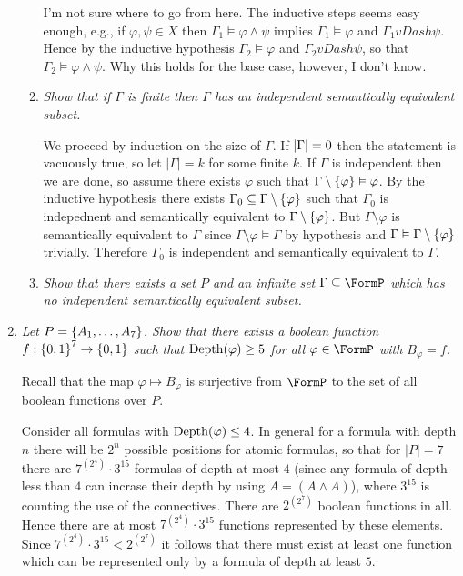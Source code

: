 \documentclass[10pt]{article}
\begin{document}
\begin{enumerate}
\begin{enumerate}
I'm not sure where to go from here.  The inductive steps seems easy enough, e.g., if $\varphi, \psi \in X$ then $\Gamma_1 \vDash \varphi \land \psi$ implies $\Gamma_1 \vDash \varphi$ and $\Gamma_1 vDash \psi$. Hence by the inductive hypothesis $\Gamma_2 \vDash \varphi$ and $\Gamma_2 vDash \psi$, so that $\Gamma_2 \vDash \varphi \land \psi$.  Why this holds for the base case, however, I don't know.

\item \emph{Show that if $\Gamma$ is finite then $\Gamma$ has an independent semantically equivalent subset.}

We proceed by induction on the size of $\Gamma$.  If $\left| \Gamma \right| = 0$ then the statement is vacuously true, so let $|\Gamma| = k$ for some finite $k$.  If $\Gamma$ is independent then we are done, so assume there exists $\varphi$ such that $\Gamma \setminus \left\{ \varphi \right\} \vDash \varphi$.  By the inductive hypothesis there exists $\Gamma_0 \subseteq \Gamma\setminus\left\{ \varphi \right\}$ such that $\Gamma_0$ is indepednent and semantically equivalent to $\Gamma \setminus \left\{ \varphi \right\}$.  But $\Gamma \setminus{\varphi}$ is semantically equivalent to $\Gamma$ since $\Gamma \setminus{\varphi} \vDash \Gamma$ by hypothesis and $\Gamma \vDash \Gamma \setminus \left\{ \varphi \right\}$ trivially.  Therefore $\Gamma_0$ is independent and semantically equivalent to $\Gamma$.

\item \emph{Show that there exists a set $P$ and an infinite set $\Gamma \subseteq \FormP$ which has no independent semantically equivalent subset.}
\end{enumerate}

\item \emph{Let $P = \left\{ A_1, \ldots, A_7 \right\}$.  Show that there exists a boolean function $f: \left\{ 0,1 \right\}^7 \to \left\{ 0,1 \right\}$ such that $\operatorname{Depth}(\varphi) \geq 5$ for all $\varphi \in \FormP$ with $B_{\varphi} = f$.}

Recall that the map $\varphi \mapsto B_\varphi$ is surjective from $\FormP$ to the set of all boolean functions over $P$.

Consider all formulas with $\operatorname{Depth}(\varphi) \leq 4$.  In general for a formula with depth $n$ there will be $2^n$ possible positions for atomic formulas, so that for $|P| = 7$ there are $7^{(2^4)} \cdot 3^15$ formulas of depth at most $4$ (since any formula of depth less than $4$ can incrase their depth by using $A = (A \land A)$), where $3^15$ is counting the use of the connectives.  There are $2^{(2^7)}$ boolean functions in all.  Hence there are at most $7^{(2^4)}\cdot 3^15$ functions represented by these elements.  Since $7^{(2^4)} \cdot 3^15 < 2^{(2^7)}$ it follows that there must exist at least one function which can be represented only by a formula of depth at least $5$.


\end{enumerate}
\end{document}

